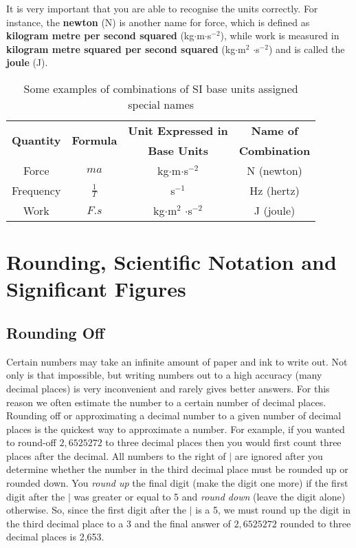\documentclass[10pt,a4paper,titlepage,twoside,openright]{report}
\begin{document}
It is very important that you are able to recognise the units
correctly. For instance, the {\bf newton} (N) is another name for force, which is defined as {\bf kilogram metre per second squared} 
(kg$\cdot$m$\cdot$s$^{-2}$), while work is measured in {\bf kilogram metre squared per second squared} (kg$\cdot$m$^2$ $\cdot$s$^{-2}$) and is called the
{\bf joule} (J).

\begin{table}[htbp]
\centering
\begin{tabular}{|c|c|c|c|}\hline
\multirow{2}{*}{\textbf{Quantity}}& \multirow{2}{*}{\textbf{Formula}}&\textbf{Unit Expressed in}&\textbf{Name of}\\
& &\textbf{Base Units}&\textbf{Combination} \\\hline
Force & $ma$ & kg$\cdot$m$\cdot$s$^{-2}$ & N (newton) \\
Frequency & $\frac{1}{T}$ & s$^{-1}$ & Hz (hertz)\\
Work & $F.s$ & kg$\cdot$m$^2$ $\cdot$s$^{-2}$ & J (joule) \\
\hline
\end{tabular}
\caption{Some examples of combinations of SI base units assigned
special names}\label{tab:dim:combos}
\end{table}


\section{Rounding, Scientific Notation and Significant Figures}
\subsection{Rounding Off}
Certain numbers may take an infinite amount of paper and ink to write out. Not only is that impossible, but writing numbers out to a high accuracy (many decimal places) is very inconvenient and rarely gives better answers. For this reason we often estimate the number to a certain number of decimal places.
Rounding off or approximating a decimal number to a given number of decimal places is the quickest way to approximate a number. For example, if you wanted to round-off $2,6525272$ to three decimal places then you would first count three places after the decimal.
All numbers to the right of $|$ are ignored after you determine whether the number in the third decimal place must be rounded up or rounded down. You \textit{round up} the final digit (make the digit one more) if the first digit after the $|$ was greater or equal to 5 and \textit{round down} (leave the digit alone) otherwise.
So, since the first digit after the $|$ is a 5, we must round up the digit in the third decimal place to a 3 and the final answer of $2,6525272$ rounded to three decimal places is 2,653.
\end{document}
